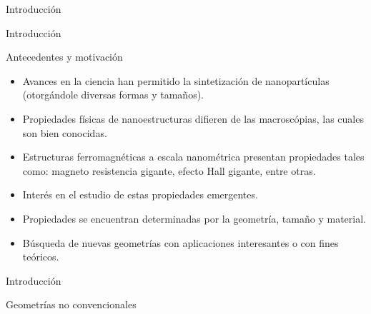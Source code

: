 \begin{frame}
\vfill
\begin{center}
\begin{block}{\begin{center}\begin{Huge}Introducción\end{Huge}\end{center}}
\end{block}
\end{center}
\end{frame}

\begin{frame}{Introducción}
\begin{block}{Antecedentes y motivación}
\begin{itemize}
  \item Avances en la ciencia han permitido la sintetización de nanopartículas (otorgándole diversas formas y tamaños).
  \item Propiedades físicas de nanoestructuras difieren de las macroscópias, las cuales son bien conocidas.
  \item Estructuras ferromagnéticas a escala nanométrica presentan propiedades tales como: magneto resistencia gigante, efecto Hall gigante, entre otras.
  \item Interés en el estudio de estas propiedades emergentes.
  \item Propiedades se encuentran determinadas por la geometría, tamaño y material.
  \item Búsqueda de nuevas geometrías con aplicaciones interesantes o con fines teóricos.
\end{itemize}
\end{block}
\end{frame}

\begin{frame}{Introducción}
\begin{block}{Geometrías no convencionales}
\centerline{}
\end{block}
\end{frame}

